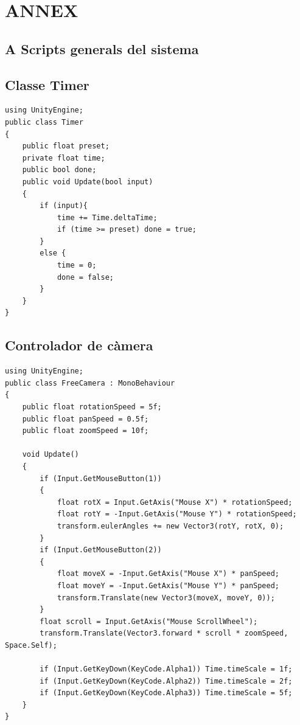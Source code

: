 \documentclass[a4paper,11pt,DIV=13,headings=normal,abstract=true,twoside=semi]{article}
\begin{document}
\newpage
{}

\printbibliography

\newpage
\section*{ANNEX}



\subsection*{\textbf{A} Scripts generals del sistema}

\subsection*{Classe Timer}

\begin{lstlisting}[style=modern, caption={Classe Timer}, label={lst:timer}]
using UnityEngine;
public class Timer
{
    public float preset;
    private float time;
    public bool done;
    public void Update(bool input)
    {
        if (input){
            time += Time.deltaTime;
            if (time >= preset) done = true;
        }
        else {
            time = 0;
            done = false;
        }
    }
}
\end{lstlisting}

\subsection*{Controlador de càmera}

\begin{lstlisting}[style=modern, caption={Controlador de càmera lliure}, label={lst:freecamera}]
using UnityEngine;
public class FreeCamera : MonoBehaviour
{
    public float rotationSpeed = 5f;
    public float panSpeed = 0.5f;
    public float zoomSpeed = 10f;

    void Update()
    {
        if (Input.GetMouseButton(1))
        {
            float rotX = Input.GetAxis("Mouse X") * rotationSpeed;
            float rotY = -Input.GetAxis("Mouse Y") * rotationSpeed;
            transform.eulerAngles += new Vector3(rotY, rotX, 0);
        }
        if (Input.GetMouseButton(2))
        {
            float moveX = -Input.GetAxis("Mouse X") * panSpeed;
            float moveY = -Input.GetAxis("Mouse Y") * panSpeed;
            transform.Translate(new Vector3(moveX, moveY, 0));
        }
        float scroll = Input.GetAxis("Mouse ScrollWheel");
        transform.Translate(Vector3.forward * scroll * zoomSpeed, Space.Self);

        if (Input.GetKeyDown(KeyCode.Alpha1)) Time.timeScale = 1f;
        if (Input.GetKeyDown(KeyCode.Alpha2)) Time.timeScale = 2f;
        if (Input.GetKeyDown(KeyCode.Alpha3)) Time.timeScale = 5f;
    }
}
\end{lstlisting}
\end{document}
